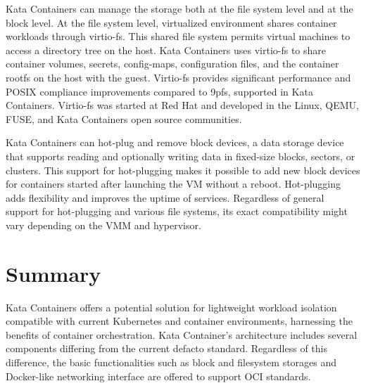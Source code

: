 Kata Containers can manage the storage both at the file system level and at the block level. At the file system level, virtualized environment shares container workloads through virtio-fs. This shared file system permits virtual machines to access a directory tree on the host. Kata Containers uses virtio-fs to share container volumes, secrets, config-maps, configuration files, and the container rootfs on the host with the guest. Virtio-fs provides significant performance and POSIX compliance improvements compared to 9pfs, supported in Kata Containers. Virtio-fs was started at Red Hat and developed in the Linux, QEMU, FUSE, and Kata Containers open source communities. \cite{virtio-fs-Kata}\cite{virtio-fs}

Kata Containers can hot-plug and remove block devices, a data storage device that supports reading and optionally writing data in fixed-size blocks, sectors, or clusters. This support for hot-plugging makes it possible to add new block devices for containers started after launching the VM without a reboot. Hot-plugging adds flexibility and improves the uptime of services. Regardless of general support for hot-plugging and various file systems, its exact compatibility might vary depending on the VMM and hypervisor. \cite{KataContainersArchitecture}\cite{KataContainersVirtualization}

\section{Summary}

Kata Containers offers a potential solution for lightweight workload isolation compatible with current Kubernetes and container environments, harnessing the benefits of container orchestration. Kata Container's architecture includes several components differing from the current defacto standard. Regardless of this difference, the basic functionalities such as block and filesystem storages and Docker-like networking interface are offered to support OCI standards.